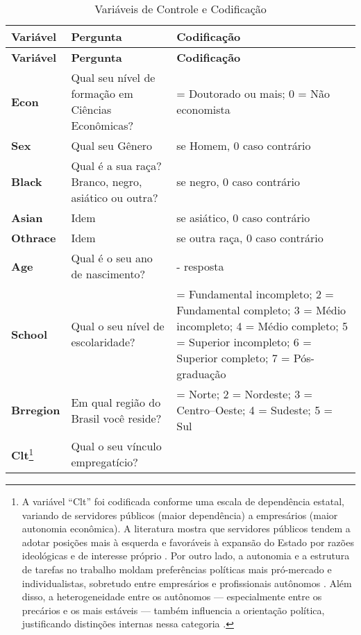 \begin{longtable}{|>{\raggedright\arraybackslash}p{4cm} 
                  |>{\raggedright\arraybackslash}p{8cm} 
                  |>{\raggedright\arraybackslash}p{4cm}|}
    \caption{Variáveis de Controle e Codificação}
    \label{tab:control_variables} \\
    \hline
    \textbf{Variável} & \textbf{Pergunta} & \textbf{Codificação} \\
    \hline
    \endfirsthead

    \hline
    \textbf{Variável} & \textbf{Pergunta} & \textbf{Codificação} \\
    \hline
    \endhead

    \hline
    \endfoot

    \hline
    \endlastfoot

    \textbf{Econ} & Qual seu nível de formação em Ciências Econômicas? & 
    1 = Doutorado ou mais; 0 = Não economista \\ 
    \hline
    \textbf{Sex} & Qual seu Gênero & 
    1 se Homem, 0 caso contrário \\ 
    \hline
    \textbf{Black} & Qual é a sua raça? Branco, negro, asiático ou outra? & 1 se negro, 0 caso contrário \\ 
    \hline
    \textbf{Asian} & Idem & 1 se asiático, 0 caso contrário \\ 
    \hline
    \textbf{Othrace} & Idem & 1 se outra raça, 0 caso contrário \\   \hline
    \textbf{Age} & Qual é o seu ano de nascimento? & 
    2025 - resposta \\
    \hline
    \textbf{School} & Qual o seu nível de escolaridade? & 
    1 = Fundamental incompleto; 
    2 = Fundamental completo; 
    3 = Médio incompleto; 
    4 = Médio completo; 
    5 = Superior incompleto; 
    6 = Superior completo; 
    7 = Pós-graduação \\ 
    \hline
    \textbf{Brregion} & Em qual região do Brasil você reside? & 
    1 = Norte; 
    2 = Nordeste; 
    3 = Centro--Oeste; 
    4 = Sudeste; 
    5 = Sul \\ 
    \hline
    \textbf{Clt}\footnote{A variável ``Clt'' foi codificada conforme uma escala de dependência estatal, variando de servidores públicos (maior dependência) a empresários (maior autonomia econômica). A literatura mostra que servidores públicos tendem a adotar posições mais à esquerda e favoráveis à expansão do Estado por razões ideológicas e de interesse próprio \cite{jensen2009political}. Por outro lado, a autonomia e a estrutura de tarefas no trabalho moldam preferências políticas mais pró-mercado e individualistas, sobretudo entre empresários e profissionais autônomos \cite{kitschelt2014occupations}. Além disso, a heterogeneidade entre os autônomos — especialmente entre os precários e os mais estáveis — também influencia a orientação política, justificando distinções internas nessa categoria \cite{jansen2016self}.}  & Qual o seu vínculo empregatício? & 

\end{longtable}
